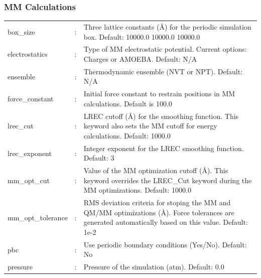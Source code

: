 \documentclass[12pt]{report}
\begin{document}
\subsubsection{MM Calculations}
\begin{center}
\begin{longtable}{ p{4cm} c p{12.5cm}}
box\_size & : & Three lattice constants (\AA) for the periodic simulation box.
Default: 10000.0 10000.0 10000.0 \newline \\

electrostatics & : & Type of MM electrostatic potential.
Current options: Charges or AMOEBA.
Default: N/A \newline\\

ensemble & : & Thermodynamic ensemble (NVT or NPT).
Default: N/A \newline\\

force\_constant & : &
Initial force constant to restrain
positions in MM calculations.
Default is 100.0\newline \\

lrec\_cut & : & LREC cutoff (\AA) for the smoothing function.
This keyword also sets the MM cutoff for energy calculations.
Default: 1000.0 \newline\\

lrec\_exponent & : & Integer exponent for the LREC smoothing function.
Default: 3 \newline\\

mm\_opt\_cut & : & Value of the MM optimization cutoff (\AA).
This keyword overrides the LREC\_Cut keyword during the MM optimizations.
Default: 1000.0 \newline\\

mm\_opt\_tolerance & : & RMS deviation criteria for stoping the MM and QM/MM
optimizations (\AA).
Force tolerances are generated automatically based on this value.
Default: 1e-2 \newline\\

pbc & : & Use periodic boundary conditions (Yes/No).
Default: No \newline\\

pressure & : & Pressure of the simulation (atm).
Default: 0.0 \newline\\


\end{longtable}
\end{center}
\end{document}
